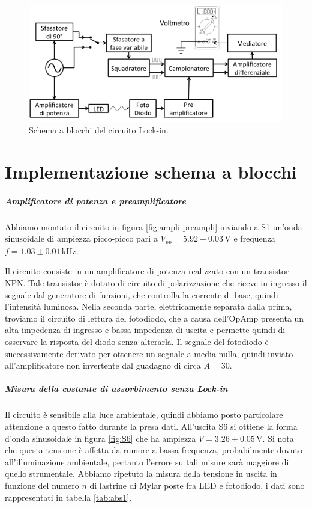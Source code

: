 \documentclass[10pt,a4paper]{article}
\begin{document}
\begin{figure}[!htb]
  \centering
  \includegraphics[scale=0.75]{schemablocchi.png}
\caption{Schema a blocchi del circuito Lock-in.\label{fig:schemablocchi}}
\end{figure}


\section{Implementazione schema a blocchi}

\subparagraph{Amplificatore di potenza e preamplificatore}
Abbiamo montato il circuito in figura \ref{fig:ampli-preampli} inviando a S1 un'onda sinusoidale di ampiezza picco-picco pari a $V_{pp}= 5.92\pm0.03 \,\mbox{V}$ e frequenza $f=1.03\pm0.01\,\mbox{kHz}$. 

Il circuito consiste in un amplificatore di potenza realizzato con un transistor NPN. Tale transistor è
dotato di circuito di polarizzazione che riceve in ingresso il segnale dal generatore di funzioni, che controlla la corrente di base, quindi l'intensità luminosa. Nella seconda parte, elettricamente separata dalla prima, troviamo il  circuito di lettura del fotodiodo, che a causa dell'OpAmp presenta un alta impedenza di ingresso e bassa impedenza di uscita e permette quindi di osservare la risposta del diodo senza alterarla.%
Il segnale del fotodiodo è successivamente derivato per ottenere un segnale a media nulla, quindi inviato all'amplificatore non invertente dal guadagno di circa $A = 30$.\\ 

\subparagraph{Misura della costante di assorbimento senza Lock-in}
Il circuito è sensibile alla luce ambientale, quindi abbiamo posto particolare attenzione a questo fatto durante la presa dati. %
All'uscita S6 si ottiene la forma d'onda sinusoidale in figura \ref{fig:S6} che ha ampiezza $V=3.26\pm0.05\,\mbox{V}$. Si nota che questa tensione è affetta da rumore a bassa frequenza, probabilmente dovuto all'illuminazione ambientale, pertanto l'errore su tali misure sarà maggiore di quello strumentale.
Abbiamo ripetuto la misura della tensione in uscita in funzione del numero $n$ di lastrine di Mylar poste fra LED e fotodiodo, i dati sono rappresentati in tabella \ref{tab:abs1}. 
\end{document}
